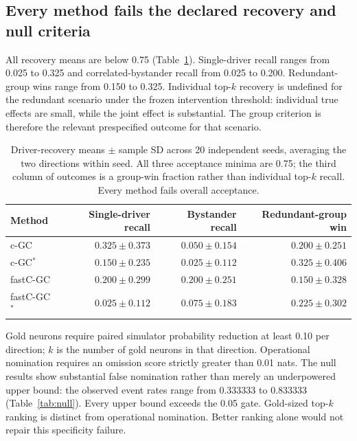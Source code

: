 \documentclass[11pt,a4paper]{article}
\newcommand{\cgc}{c-GC}
\newcommand{\cgcs}{c-GC$^{*}$}
\newcommand{\fastcgc}{fastC-GC}
\newcommand{\fastcgcs}{fastC-GC$^{*}$}
\begin{document}
\subsection{Every method fails the declared recovery and null criteria}

All recovery means are below 0.75 (Table~\ref{tab:recovery}). Single-driver recall
ranges from 0.025 to 0.325 and correlated-bystander recall from 0.025 to 0.200.
Redundant-group wins range from 0.150 to 0.325. Individual top-$k$ recovery is
undefined for the redundant scenario under the frozen intervention threshold:
individual true effects are small, while the joint effect is substantial. The
group criterion is therefore the relevant prespecified outcome for that scenario.

\begin{table}[htbp]
\centering
\small
\caption{Driver-recovery means $\pm$ sample SD across 20 independent seeds,
averaging the two directions within seed. All three acceptance minima are 0.75;
the third column of outcomes is a group-win fraction rather than individual
top-$k$ recall. Every method fails overall acceptance.}
\label{tab:recovery}
\begin{tabular}{@{}lrrr@{}}
\toprule
Method & Single-driver recall & Bystander recall & Redundant-group win \\
\midrule
\cgc & $0.325 \pm 0.373$ & $0.050 \pm 0.154$ & $0.200 \pm 0.251$ \\
\cgcs & $0.150 \pm 0.235$ & $0.025 \pm 0.112$ & $0.325 \pm 0.406$ \\
\fastcgc & $0.200 \pm 0.299$ & $0.200 \pm 0.251$ & $0.150 \pm 0.328$ \\
\fastcgcs & $0.025 \pm 0.112$ & $0.075 \pm 0.183$ & $0.225 \pm 0.302$ \\
\bottomrule
\end{tabular}
\end{table}

Gold neurons require paired simulator probability reduction at least 0.10 per
direction; $k$ is the number of gold neurons in that direction. Operational
nomination requires an omission score strictly greater than 0.01 nats.
The null results show substantial false nomination rather than merely an
underpowered upper bound: the observed event rates range from 0.333333 to 0.833333
(Table~\ref{tab:null}). Every upper bound exceeds the 0.05 gate. Gold-sized top-$k$
ranking is distinct from operational nomination. Better ranking alone would not repair this specificity
failure.
\end{document}
